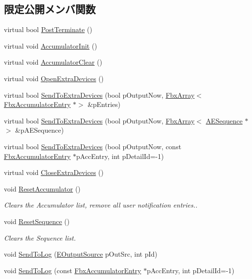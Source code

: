 \subsection*{限定公開メンバ関数}
\begin{DoxyCompactItemize}
\item 
virtual bool \hyperlink{class_fbx_user_notification_a1cdf9a0fb7ec5e1f455f95b41d7440cc}{Post\+Terminate} ()
\item 
virtual void \hyperlink{class_fbx_user_notification_a07fd5ef9836a3c445641dbbab9900ecd}{Accumulator\+Init} ()
\item 
virtual void \hyperlink{class_fbx_user_notification_a3ac8af5a7f64cdd9926080b0c439e21d}{Accumulator\+Clear} ()
\item 
virtual void \hyperlink{class_fbx_user_notification_a769c1f94ef0032d465c777ff78dc698b}{Open\+Extra\+Devices} ()
\item 
virtual bool \hyperlink{class_fbx_user_notification_a8606241edfd85444dee6a5c924947830}{Send\+To\+Extra\+Devices} (bool p\+Output\+Now, \hyperlink{class_fbx_array}{Fbx\+Array}$<$ \hyperlink{class_fbx_accumulator_entry}{Fbx\+Accumulator\+Entry} $\ast$$>$ \&p\+Entries)
\item 
virtual bool \hyperlink{class_fbx_user_notification_a12d7a9462d6f95d1fa8f6f6673595fb7}{Send\+To\+Extra\+Devices} (bool p\+Output\+Now, \hyperlink{class_fbx_array}{Fbx\+Array}$<$ \hyperlink{class_fbx_user_notification_1_1_a_e_sequence}{A\+E\+Sequence} $\ast$$>$ \&p\+A\+E\+Sequence)
\item 
virtual bool \hyperlink{class_fbx_user_notification_a34a14bfbded4d19df3d3da02d9ec38b7}{Send\+To\+Extra\+Devices} (bool p\+Output\+Now, const \hyperlink{class_fbx_accumulator_entry}{Fbx\+Accumulator\+Entry} $\ast$p\+Acc\+Entry, int p\+Detail\+Id=-\/1)
\item 
virtual void \hyperlink{class_fbx_user_notification_a337f7ce9500c5d7264c22763e986e0b7}{Close\+Extra\+Devices} ()
\item 
void \hyperlink{class_fbx_user_notification_ac22297d000470fb8317a37631a651405}{Reset\+Accumulator} ()
\begin{DoxyCompactList}\small\item\em Clears the Accumulator list, remove all user notification entries.. \end{DoxyCompactList}\item 
void \hyperlink{class_fbx_user_notification_af86faaf21fa589ddaeca8289449e0fb4}{Reset\+Sequence} ()
\begin{DoxyCompactList}\small\item\em Clears the Sequence list. \end{DoxyCompactList}\item 
void \hyperlink{class_fbx_user_notification_a5c474638feeb169465ad788135f02567}{Send\+To\+Log} (\hyperlink{class_fbx_user_notification_a45290aa788e47fce1d7b8a88687aa184}{E\+Output\+Source} p\+Out\+Src, int p\+Id)
\item 
void \hyperlink{class_fbx_user_notification_a30f2f9c1bfee2dc9ab6b17285e3719bc}{Send\+To\+Log} (const \hyperlink{class_fbx_accumulator_entry}{Fbx\+Accumulator\+Entry} $\ast$p\+Acc\+Entry, int p\+Detail\+Id=-\/1)
\end{DoxyCompactItemize}
